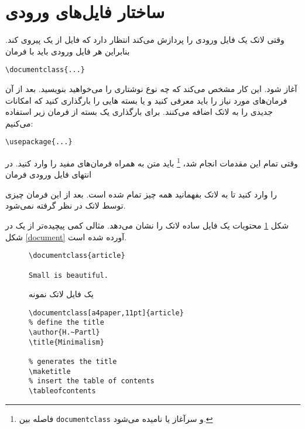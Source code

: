 {\section{ساختار فایل‌های ورودی}
وقتی لاتک یک فایل ورودی را پردازش می‌کند انتظار دارد که فایل از یک 
پیروی کند. بنابراین هر فایل ورودی باید با فرمان
\begin{code}
\verb|\documentclass{...}|
\end{code}
آغاز شود. این کار مشخص می‌کند که چه نوع نوشتاری را می‌خواهید بنویسید. بعد از آن فرمان‌های مورد نیاز را باید معرفی کنید و یا بسته
%
هایی را بارگذاری کنید که امکانات جدیدی را به لاتک اضافه می‌کنند. برای بارگذاری یک بسته از فرمان زیر استفاده می‌کنیم:
\begin{code}
\verb|\usepackage{...}|
\end{code}
وقتی تمام این مقدمات انجام شد،%
\footnote{فاصله بین \texttt{\bs    documentclass} و  سرآغاز یا  \emph{} نامیده می‌شود.}
باید متن به همراه فرمان‌های مفید را وارد کنید. در انتهای فایل ورودی فرمان 
\begin{code}
\verb||
\end{code}
را وارد کنید تا به لاتک بفهمانید همه چیز تمام شده است. بعد از این فرمان چیزی توسط لاتک در نظر گرفته نمی‌شود.

شکل 
\ref{mini}
 محتویات یک فایل ساده لاتک را نشان می‌دهد. مثالی کمی پیچیده‌تر از یک 
در شکل
\ref{document} 
آورده شده است.
\begin{figure}[!htbp]
\setLR
\begin{lined}{6cm}
\begin{verbatim}
\documentclass{article}

Small is beautiful.

\end{verbatim}
\end{lined}
\setRL
\caption{یک فایل لاتک نمونه} \label{mini}
\end{figure}
 
\begin{figure}[!htbp]
\begin{lined}{10cm}
\setLR
\begin{verbatim}
\documentclass[a4paper,11pt]{article}
% define the title
\author{H.~Partl}
\title{Minimalism}

% generates the title
\maketitle 
% insert the table of contents
\tableofcontents

\end{verbatim}
\end{lined}
\end{figure}}
